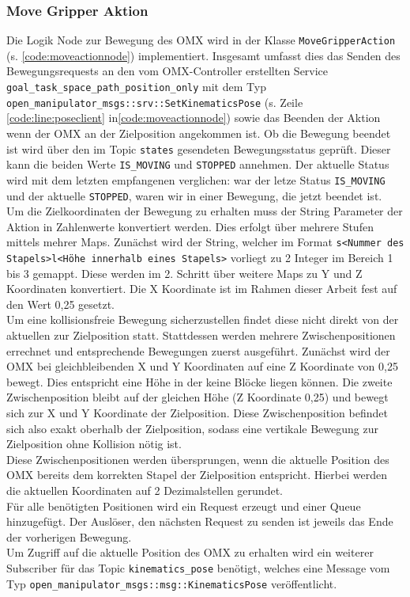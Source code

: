 \subsubsection{Move Gripper Aktion}
Die Logik Node zur Bewegung des OMX wird in der Klasse \verb|MoveGripperAction| (s. \ref{code:moveactionnode}) implementiert. Insgesamt umfasst dies das Senden des Bewegungsrequests an den vom OMX-Controller erstellten Service \verb|goal_task_space_path_position_only| mit dem Typ \verb|open_manipulator_msgs::srv::SetKinematicsPose| (s. Zeile \ref{code:line:poseclient} in\ref{code:moveactionnode}) sowie das Beenden der Aktion wenn der OMX an der Zielposition angekommen ist. Ob die Bewegung beendet ist wird über den im Topic \verb|states| gesendeten Bewegungsstatus geprüft. Dieser kann die beiden Werte \verb|IS_MOVING| und \verb|STOPPED| annehmen. Der aktuelle Status wird mit dem letzten empfangenen verglichen: war der letze Status \verb|IS_MOVING| und der aktuelle \verb|STOPPED|, waren wir in einer Bewegung, die jetzt beendet ist.\\
Um die Zielkoordinaten der Bewegung zu erhalten muss der String Parameter der Aktion in Zahlenwerte konvertiert werden. Dies erfolgt über mehrere Stufen mittels mehrer Maps. Zunächst wird der String, welcher im Format \verb|s<Nummer des Stapels>l<Höhe innerhalb eines Stapels>| vorliegt zu 2 Integer im Bereich 1 bis 3 gemappt. Diese werden im 2. Schritt über weitere Maps zu Y und Z Koordinaten konvertiert. Die X Koordinate ist im Rahmen dieser Arbeit fest auf den Wert 0,25 gesetzt.\\
Um eine kollisionsfreie Bewegung sicherzustellen findet diese nicht direkt von der aktuellen zur Zielposition statt. Stattdessen werden mehrere Zwischenpositionen errechnet und entsprechende Bewegungen zuerst ausgeführt. Zunächst wird der OMX bei gleichbleibenden X und Y Koordinaten auf eine Z Koordinate von 0,25 bewegt. Dies entspricht eine Höhe in der keine Blöcke liegen können. Die zweite Zwischenposition bleibt auf der gleichen Höhe (Z Koordinate 0,25) und bewegt sich zur X und Y Koordinate der Zielposition. Diese Zwischenposition befindet sich also exakt oberhalb der Zielposition, sodass eine vertikale Bewegung zur Zielposition ohne Kollision nötig ist.\\
Diese Zwischenpositionen werden übersprungen, wenn die aktuelle Position des OMX bereits dem korrekten Stapel der Zielposition entspricht. Hierbei werden die aktuellen Koordinaten auf 2 Dezimalstellen gerundet.\\
Für alle benötigten Positionen wird ein Request erzeugt und einer Queue hinzugefügt. Der Auslöser, den nächsten Request zu senden ist jeweils das Ende der vorherigen Bewegung.\\
Um Zugriff auf die aktuelle Position des OMX zu erhalten wird ein weiterer Subscriber für das Topic \verb|kinematics_pose| benötigt, welches eine Message vom Typ \verb|open_manipulator_msgs::msg::KinematicsPose| veröffentlicht.



